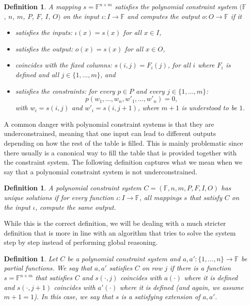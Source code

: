 \documentclass[11pt,letterpaper]{article}
\newtheorem{definition}[dummytheorem]{Definition}
\newcommand{\ff}{\mathbb{F}}
\begin{document}
\begin{definition}
A mapping $s = \ff^{n\times m}$ \emph{satisfies} the polynomial constraint system $(\ff$, $n$, $m$, $P$, $F$, $I$, $O)$
on the input $\iota \colon I \to \ff$ and \emph{computes the output} $o \colon O \to \ff$ if it 
\begin{itemize}
\item satisfies the inputs: $\iota(x) = s(x)$ for all $x \in I$,
\item satisfies the output: $o(x) = s(x)$ for all $x \in O$,
\item coincides with the fixed columns: $s(i, j) = F_i(j)$, for all $i$ where $F_i$ is defined and all $j \in \{1,\dots,m\}$, and 
\item satisfies the constraints: for every $p \in P$ and every $j \in \{1,\dots,m\}$:\[p(w_1,\dots,w_n,w'_1,\dots,w'_n) = 0,\]
with $w_i = s(i, j)$ and $w'_i = s(i, j + 1)$, where $m + 1$ is understood to be $1$.
\end{itemize}
\end{definition}

A common danger with polynomial constraint systems is that they are underconstrained, meaning that
one input can lead to different outputs depending on how the rest of the table is filled.
This is mainly problematic since there usually is a canonical way to fill the table that is provided together
with the constraint system. The following definition captures what we mean when we say that a polynomial
constraint system is not underconstrained.
\begin{definition}
A polynomial constraint system $C = (\ff, n, m, P, F, I, O)$ has \emph{unique solutions} if
for every function $\iota \colon I \to \ff$, all mappings $s$ that satisfy $C$ on the input $\iota$,
compute the same output.
\end{definition}

While this is the correct definition, we will be dealing with a much stricter definition
that is more in line with an algorithm that tries to solve the system step by step
instead of performing global reasoning.

\begin{definition}
Let $C$ be a polynomial constraint system and $a, a' \colon \{1,\dots,n\} \to \ff$ be partial functions.
We say that $a,a'$ \emph{satisfies} $C$ on row $j$ if there is a function
$s = \ff^{n\times m}$ that satisfies $C$ and $s(\cdot,j)$ coincides with $a(\cdot)$ where it is defined
and $s(\cdot,j+1)$ coincides with $a'(\cdot)$ where it is defined (and again, we assume $m+1 = 1$).
In this case, we say that $s$ is a \emph{satisfying extension} of $a,a'$.
\end{definition}
\end{document}
